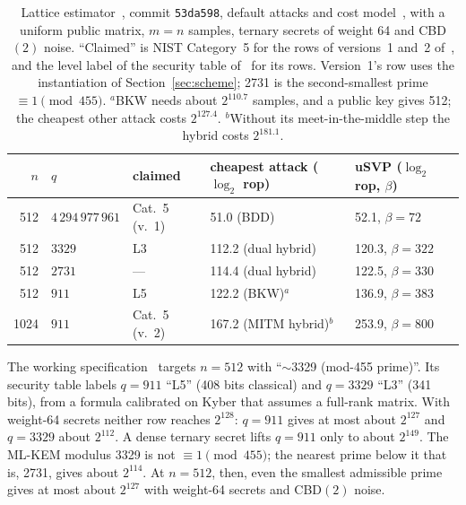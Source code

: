 \documentclass[11pt]{article}
\theoremstyle{remark}
\begin{document}
\begin{table}[h]\centering\small
\begin{tabular}{rllll}\toprule
$n$ & $q$ & claimed & cheapest attack ($\log_2$ rop) & uSVP ($\log_2$ rop, $\beta$)\\\midrule
512 & $4\,294\,977\,961$ & Cat.~5 (v.~1) & 51.0 (BDD) & 52.1, $\beta=72$\\
512 & $3329$ & L3~\cite{Gif26b} & 112.2 (dual hybrid) & 120.3, $\beta=322$\\
512 & $2731$ & --- & 114.4 (dual hybrid) & 122.5, $\beta=330$\\
512 & $911$ & L5~\cite{Gif26b} & 122.2 (BKW)$^{a}$ & 136.9, $\beta=383$\\
1024 & $911$ & Cat.~5 (v.~2) & 167.2 (MITM hybrid)$^{b}$ & 253.9, $\beta=800$\\\bottomrule
\end{tabular}
\caption{Lattice estimator~\cite{estimator}, commit \texttt{53da598}, default attacks and cost model~\cite{MATZOV}, with a
uniform public matrix, $m=n$ samples, ternary secrets of weight 64 and CBD$(2)$ noise. ``Claimed'' is NIST Category~5
for the rows of versions~1 and~2 of~\cite{Gif26a}, and the level label of the security table of~\cite{Gif26b} for its
rows. Version~1's row uses the instantiation of Section~\ref{sec:scheme}; 2731 is the second-smallest prime
$\equiv1\pmod{455}$. $^{a}$BKW needs about $2^{110.7}$ samples, and a public key gives 512; the cheapest other attack
costs $2^{127.4}$. $^{b}$Without its meet-in-the-middle step the hybrid costs $2^{181.1}$.}\label{tab:est}
\end{table}

The working specification~\cite{Gif26b} targets $n=512$ with ``$\sim$3329 (mod-455 prime)''. Its security table
labels $q=911$ ``L5'' (408 bits classical) and $q=3329$ ``L3'' (341 bits), from a formula calibrated on Kyber that
assumes a full-rank matrix. With weight-64 secrets neither row reaches $2^{128}$: $q=911$ gives at most about $2^{127}$
and $q=3329$ about $2^{112}$. A dense ternary secret lifts $q=911$ only to about $2^{149}$. The ML-KEM modulus 3329 is
not $\equiv1\pmod{455}$; the nearest prime below it that is, 2731, gives about $2^{114}$. At $n=512$, then, even the
smallest admissible prime gives at most about $2^{127}$ with weight-64 secrets and CBD$(2)$ noise.
\end{document}
